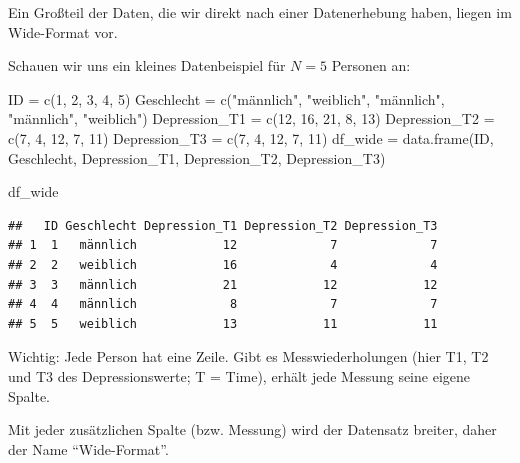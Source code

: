 \documentclass[
]{book}
\newenvironment{Shaded}{\begin{snugshade}}{\end{snugshade}}
\newcommand{\DecValTok}[1]{\textcolor[rgb]{0.00,0.00,0.81}{#1}}
\newcommand{\FunctionTok}[1]{\textcolor[rgb]{0.00,0.00,0.00}{#1}}
\newcommand{\NormalTok}[1]{#1}
\newcommand{\OtherTok}[1]{\textcolor[rgb]{0.56,0.35,0.01}{#1}}
\newcommand{\StringTok}[1]{\textcolor[rgb]{0.31,0.60,0.02}{#1}}
\begin{document}
Ein Großteil der Daten, die wir direkt nach einer Datenerhebung haben, liegen im Wide-Format vor.

Schauen wir uns ein kleines Datenbeispiel für \(N=5\) Personen an:

\begin{Shaded}
\begin{Highlighting}[]
\NormalTok{ID }\OtherTok{=} \FunctionTok{c}\NormalTok{(}\DecValTok{1}\NormalTok{, }\DecValTok{2}\NormalTok{, }\DecValTok{3}\NormalTok{, }\DecValTok{4}\NormalTok{, }\DecValTok{5}\NormalTok{)}
\NormalTok{Geschlecht }\OtherTok{=} \FunctionTok{c}\NormalTok{(}\StringTok{"männlich"}\NormalTok{, }\StringTok{"weiblich"}\NormalTok{, }\StringTok{"männlich"}\NormalTok{, }\StringTok{"männlich"}\NormalTok{, }\StringTok{"weiblich"}\NormalTok{)}
\NormalTok{Depression\_T1 }\OtherTok{=} \FunctionTok{c}\NormalTok{(}\DecValTok{12}\NormalTok{, }\DecValTok{16}\NormalTok{, }\DecValTok{21}\NormalTok{, }\DecValTok{8}\NormalTok{, }\DecValTok{13}\NormalTok{)}
\NormalTok{Depression\_T2 }\OtherTok{=} \FunctionTok{c}\NormalTok{(}\DecValTok{7}\NormalTok{, }\DecValTok{4}\NormalTok{, }\DecValTok{12}\NormalTok{, }\DecValTok{7}\NormalTok{, }\DecValTok{11}\NormalTok{)}
\NormalTok{Depression\_T3 }\OtherTok{=} \FunctionTok{c}\NormalTok{(}\DecValTok{7}\NormalTok{, }\DecValTok{4}\NormalTok{, }\DecValTok{12}\NormalTok{, }\DecValTok{7}\NormalTok{, }\DecValTok{11}\NormalTok{)}
\NormalTok{df\_wide }\OtherTok{=} \FunctionTok{data.frame}\NormalTok{(ID, Geschlecht, Depression\_T1, Depression\_T2, Depression\_T3)}

\NormalTok{df\_wide}
\end{Highlighting}
\end{Shaded}

\begin{verbatim}
##   ID Geschlecht Depression_T1 Depression_T2 Depression_T3
## 1  1   männlich            12             7             7
## 2  2   weiblich            16             4             4
## 3  3   männlich            21            12            12
## 4  4   männlich             8             7             7
## 5  5   weiblich            13            11            11
\end{verbatim}

Wichtig: Jede Person hat eine Zeile. Gibt es Messwiederholungen (hier T1, T2 und T3 des Depressionswerte; T = Time), erhält jede Messung seine eigene Spalte.

Mit jeder zusätzlichen Spalte (bzw. Messung) wird der Datensatz breiter, daher der Name ``Wide-Format''.
\end{document}
